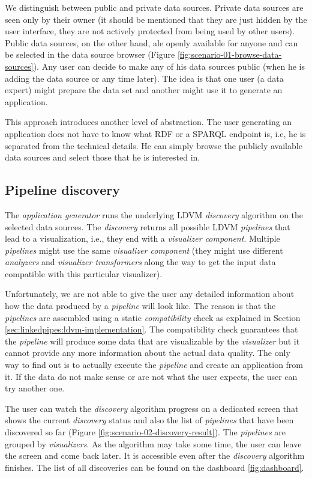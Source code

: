 We distinguish between public and private data sources. Private data sources are seen only by their owner (it should be mentioned that they are just hidden by the user interface, they are not actively protected from being used by other users). Public data sources, on the other hand, ale openly available for anyone and can be selected in the data source browser (Figure \ref{fig:scenario-01-browse-data-sources}). Any user can decide to make any of his data sources public (when he is adding the data source or any time later). The idea is that one user (a data expert) might prepare the data set and another might use it to generate an application.

This approach introduces another level of abstraction. The user generating an application does not have to know what RDF or a SPARQL endpoint is, i.e, he is separated from the technical details. He can simply browse the publicly available data sources and select those that he is interested in.

\subsection{Pipeline discovery}

The \emph{application generator} runs the underlying LDVM \emph{discovery} algorithm on the selected data sources. The \emph{discovery} returns all possible LDVM \emph{pipelines} that lead to a visualization, i.e., they end with a \emph{visualizer component}. Multiple \emph{pipelines} might use the same \emph{visualizer component} (they might use different \emph{analyzers} and \emph{visualizer transformers} along the way to get the input data compatible with this particular visualizer).

Unfortunately, we are not able to give the user any detailed information about how the data produced by a \emph{pipeline} will look like. The reason is that the \emph{pipelines} are assembled using a static \emph{compatibility} check as explained in Section~ \ref{sec:linkedpipes:ldvm-implementation}. The compatibility check guarantees that the \emph{pipeline} will produce some data that are visualizable by the \emph{visualizer} but it cannot provide any more information about the actual data quality. The only way to find out is to actually execute the \emph{pipeline} and create an application from it. If the data do not make sense or are not what the user expects, the user can try another one.

The user can watch the \emph{discovery} algorithm progress on a dedicated screen that shows the current \emph{discovery} status and also the list of \emph{pipelines} that have been discovered so far (Figure \ref{fig:scenario-02-discovery-result}). The \emph{pipelines} are grouped by \emph{visualizers}. As the algorithm may take some time, the user can leave the screen and come back later. It is accessible even after the \emph{discovery} algorithm finishes. The list of all discoveries can be found on the dashboard \ref{fig:dashboard}.

